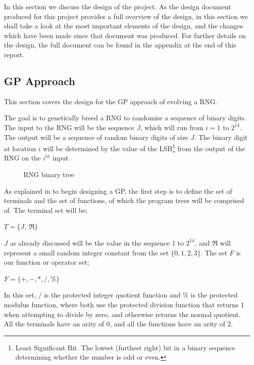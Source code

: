 \documentclass[a4paper,10.5pt]{article}
\begin{document}
In this section we discuss the design of the project. As the design document produced for this project provides a full overview of the design, in this section we shall take a look at the most important elements of the design, and the changes which have been made since that document was produced. For further details on the design, the full document can be found in the appendix at the end of this report. 
\subsection{GP Approach}
This section covers the design for the GP approach of evolving a RNG. 

The goal is to genetically breed a RNG to randomise a sequence of binary digits. The input to the RNG will be the sequence $J$, which will run from $i = 1$ to $2^{14}$. The output will be a sequence of random binary digits of size $J$. The binary digit at location $i$ will be determined by the value of the LSB\footnote{Least Significant Bit. The lowest (furthest right) bit in a binary sequence determining whether the number is odd or even.} from the output of the RNG on the $i^{th}$ input.

\begin{figure}
\caption{RNG binary tree}
\label{fig:simplebintree}
\end{figure}

As explained in \cite[p.19-27]{introgp} to begin designing a GP, the first step is to define the set of terminals and the set of functions, of which the program trees will be comprised of. The terminal set will be; \begin{center}$T = \{J,\ \Re\}$\end{center} $J$ as already discussed will be the value in the sequence 1 to $2^{14}$, and $\Re$ will represent a small random integer constant from the set $\{0, 1, 2, 3\}$. The set $F$ is our function or operator set; \begin{center}$F = \{+, -, *, /, \%\}$\end{center}In this set, $/$ is the protected integer quotient function and $\%$ is the protected modulus function, where both use the protected division function that returns 1 when attempting to divide by zero, and otherwise returns the normal quotient. All the terminals have an arity of 0, and all the functions have an arity of 2.
\end{document}
